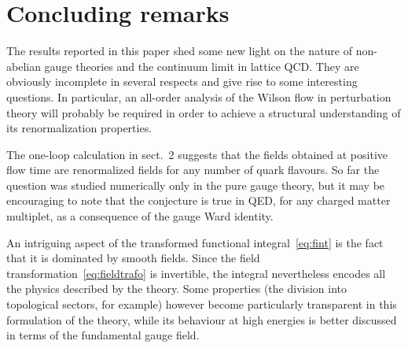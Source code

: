 \section{Concluding remarks}

The results reported in this paper shed some new light
on the nature of non-abelian gauge theories
and the continuum limit in lattice QCD.
They are obviously incomplete in several respects
and give rise to some interesting questions.
In particular, an all-order analysis of the Wilson flow in
perturbation theory will probably be required in order to achieve a
structural understanding of its renormalization properties.

The one-loop calculation in sect.~2 suggests that
the fields obtained at positive flow time are renormalized
fields for any number of quark flavours.
So far the question was studied numerically
only in the pure gauge theory,
but it may be encouraging to note that the conjecture is true
in QED, for any charged matter multiplet,
as a consequence of the gauge Ward identity.

An intriguing aspect of the transformed functional
integral~\eqref{eq:fint} is the fact that it is dominated by
smooth fields. Since the field transformation~\eqref{eq:fieldtrafo} is invertible,
the integral nevertheless encodes all the physics
described by the theory.
Some properties
(the division into topological sectors,
for example) however become particularly transparent in this formulation
of the theory,
while its behaviour at high energies is better
discussed in terms of the fundamental gauge field.
